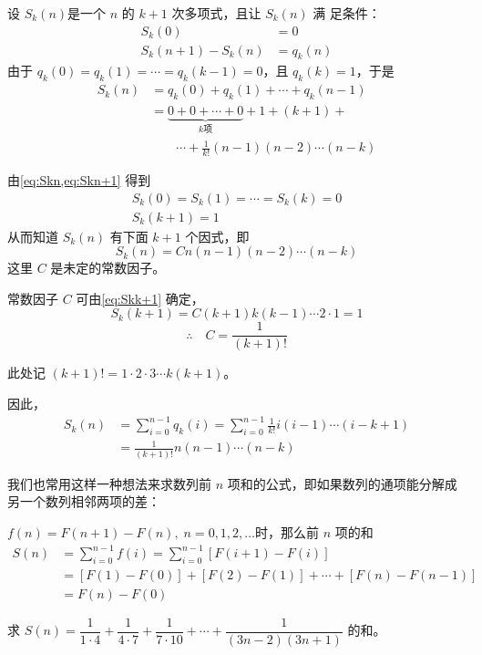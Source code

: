 \begin{solution}
设 $S_k(n)$是一个 $n$ 的 $k+1$ 次多项式，且让 $S_k(n)$ 满
足条件：
\begin{align}
    \label{eq:Skn}S_k(0)&=0\\
    \label{eq:Skn+1}S_k(n+1)-S_k(n)&=q_k(n)
\end{align}
由于 $q_k(0)=q_k(1)=\cdots=q_k(k-1)=0$，且 $q_k(k)=1$，于是
\begin{equation}
    \begin{split}
 S_k(n)&=q_k(0)+q_k(1)+\cdots+q_k(n-1)\\
&=\underbrace{0+0+\cdots+0}_{\text{$k$项}}+1+(k+1)+\\
&\qquad \cdots+
\frac{1}{k!}(n-1)(n-2)\cdots(n-k)     
    \end{split}
\end{equation}

由\cref{eq:Skn,eq:Skn+1} 得到
\begin{align}
S_k(0)=S_k(1)=\cdots=S_k(k)=0\\
\label{eq:Skk+1}S_k(k+1)=1
\end{align}
从而知道 $S_k(n)$ 有下面 $k+1$ 个因式，即
\[S_k(n)=Cn(n-1)(n-2)\cdots(n-k)\]
这里 $C$ 是未定的常数因子。

常数因子 $C$ 可由\cref{eq:Skk+1} 确定，
\[S_k(k+1)=C(k+1)k(k-1)\cdots2\cdot 1=1\]
\[\therefore\quad C=\frac{1}{(k+1)!}\]

此处记 $(k+1)!=1\cdot 2\cdot 3\cdots k(k+1)$。

因此，
\[\begin{split}
    S_k(n)&=\sum^{n-1}_{i=0} q_k(i)=\sum^{n-1}_{i=0} \frac{1}{k!}i(i-1)\cdots (i-k+1)\\
    &=\frac{1}{(k+1)!}n(n-1)\cdots (n-k)
\end{split}\]
\end{solution}

我们也常用这样一种想法来求数列前 $n$ 项和的公式，即如果数列的通项能分解成另一个数列相邻两项的差：

$f(n)=F(n+1)-F(n),\; n=0,1,2,\ldots$时，那么前 $n$ 项的和
\[\begin{split}
   S(n)&= \sum^{n-1}_{i=0} f(i)= \sum^{n-1}_{i=0} [F(i+1)-F(i)]\\
   &=[F(1)-F(0)]+[F(2)-F(1)]+\cdots +[F(n)-F(n-1)]\\
   &=F(n)-F(0)
\end{split}\]


\begin{example}
    求 $S(n)=\dfrac{1}{1\cdot 4}+\dfrac{1}{4\cdot 7}+\dfrac{1}{7\cdot 10}+\cdots +\dfrac{1}{(3n-2)(3n+1)}$ 的和。
\end{example}

